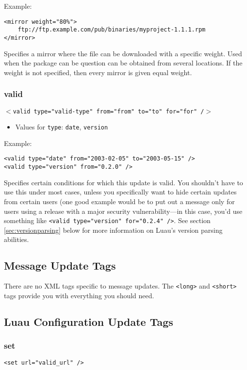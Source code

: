\documentclass{report}
\begin{document}
Example:

\begin{verbatim}
<mirror weight="80%">
    ftp://ftp.example.com/pub/binaries/myproject-1.1.1.rpm
</mirror>
\end{verbatim}

Specifies a mirror where the file can be downloaded with a specific weight.  Used when the package can be question can be obtained from several locations.  If the weight is not specified, then every mirror is given equal weight.

\subsubsection{valid}
\texttt{$<$valid type="valid-type" from="from" to="to" for="for" /$>$}

\begin{itemize}
\item Values for \texttt{type}: \texttt{date}, \texttt{version}
\end{itemize}

Example:

\begin{verbatim}
<valid type="date" from="2003-02-05" to="2003-05-15" />
<valid type="version" from="0.2.0" />
\end{verbatim}

Specifies certain conditions for which this update is valid.  You shouldn't have to use this under most cases, unless you specifically want to hide certain updates from certain users (one good example would be to put out a message only for users using a release with a major security vulnerability---in this case, you'd use something like \verb+<valid type="version" for="0.2.4" />+.  See section \ref{sec:versionparsing} below for more information on Luau's version parsing abilities.

\subsection{Message Update Tags}

There are no XML tags specific to message updates.  The \verb+<long>+ and \verb+<short>+ tags provide you with everything you should need.

\subsection{Luau Configuration Update Tags}

\subsubsection{set}
\verb+<set url="valid_url" />+
\end{document}
